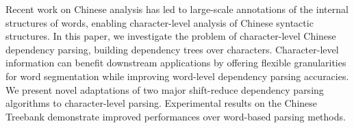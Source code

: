 Recent work on Chinese analysis has led to large-scale annotations of the internal structures of words, enabling character-level analysis of Chinese syntactic structures. In this paper, we investigate the problem of character-level Chinese dependency parsing, building dependency trees over characters. Character-level information can benefit downstream applications by offering flexible granularities for word segmentation while improving word-level dependency parsing accuracies. We present novel adaptations of two major shift-reduce dependency parsing algorithms to character-level parsing. Experimental results on the Chinese Treebank demonstrate improved performances over word-based parsing methods.
